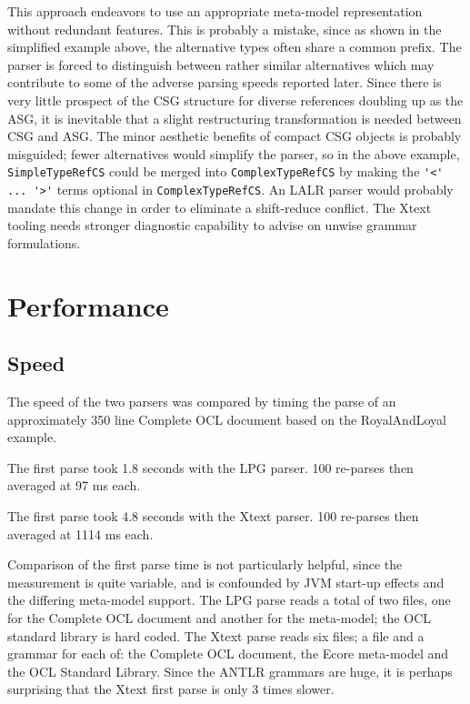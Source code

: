 \documentclass[runningheads,a4paper]{llncs}
\begin{document}
This approach endeavors to use an appropriate meta-model representation without redundant features. This is probably a mistake, since as shown in the simplified example above, the alternative types often share a common prefix. The parser is forced to distinguish between rather similar alternatives which may contribute to some of the adverse parsing speeds reported later. Since there is very little prospect of the CSG structure for diverse references doubling up as the ASG, it is inevitable that a slight restructuring transformation is needed between CSG and ASG. The minor aesthetic benefits of compact CSG objects is probably misguided; fewer alternatives would simplify the parser, so in the above example, \verb+SimpleTypeRefCS+ could be merged into \verb+ComplexTypeRefCS+ by making the \verb+'<' ... '>'+ terms optional in \verb+ComplexTypeRefCS+. An LALR parser would probably mandate this change in order to eliminate a shift-reduce conflict. The Xtext tooling needs stronger diagnostic capability to advise on unwise grammar formulations. 

\section{Performance}

\subsection{Speed}

The speed of the two parsers was compared by timing the parse of an approximately 350 line Complete OCL document based on the RoyalAndLoyal example.

The first parse took 1.8 seconds with the LPG parser. 100 re-parses then averaged at 97 ms each.

The first parse took 4.8 seconds with the Xtext parser. 100 re-parses then averaged at 1114  ms each.

Comparison of the first parse time is not particularly helpful, since the measurement is quite variable, and is confounded by JVM start-up effects and the differing meta-model support. The LPG parse reads a total of two files, one for the Complete OCL document and another for the meta-model; the OCL standard library is hard coded. The Xtext parse reads six files; a file and a grammar for each of: the Complete OCL document, the Ecore meta-model and the OCL Standard Library. Since the ANTLR grammars are huge, it is perhaps surprising that the Xtext first parse is only 3 times slower.
\end{document}
